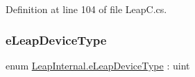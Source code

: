 Definition at line 104 of file Leap\+C.\+cs.

\mbox{\label{namespace_leap_internal_a2f134f9672b8f6ded5ec9979abc7fe91}} 
\subsubsection{\texorpdfstring{eLeapDeviceType}{eLeapDeviceType}}
{\footnotesize\ttfamily enum \mbox{\hyperlink{namespace_leap_internal_a2f134f9672b8f6ded5ec9979abc7fe91}{Leap\+Internal.\+e\+Leap\+Device\+Type}} \+: uint\hspace{0.3cm}{\ttfamily [strong]}}

